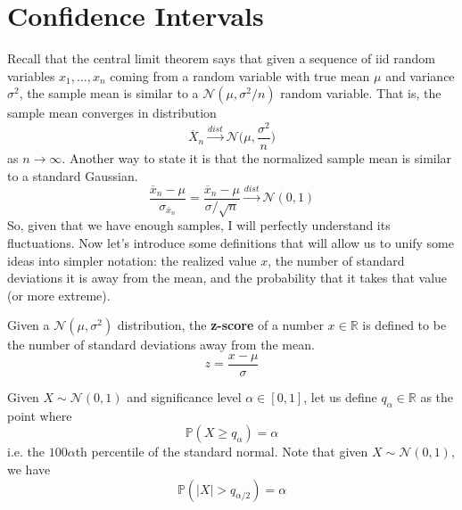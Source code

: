\section{Confidence Intervals}

  Recall that the central limit theorem says that given a sequence of iid random variables $x_1, \ldots, x_n$ coming from a random variable with true mean $\mu$ and variance $\sigma^2$, the sample mean is similar to a $\mathcal{N}(\mu, \sigma^2 / n)$ random variable. That is, the sample mean converges in distribution 
  \begin{equation}
    \overline{X}_n \xrightarrow{dist} \mathcal{N} \Big( \mu, \frac{\sigma^2}{n} \Big)
  \end{equation}
  as $n \rightarrow \infty$. Another way to state it is that the normalized sample mean is similar to a standard Gaussian. 
  \begin{equation}
    \frac{\overline{x}_n - \mu}{\sigma_{\overline{x}_n}} = \frac{\overline{x}_n - \mu}{\sigma / \sqrt{n}} \xrightarrow{dist} \mathcal{N}(0, 1)
  \end{equation}
  So, given that we have enough samples, I will perfectly understand its fluctuations. Now let's introduce some definitions that will allow us to unify some ideas into simpler notation: the realized value $x$, the number of standard deviations it is away from the mean, and the probability that it takes that value (or more extreme). 

  \begin{definition}[z-score]
    Given a $\mathcal{N}(\mu, \sigma^2)$ distribution, the \textbf{z-score} of a number $x \in \mathbb{R}$ is defined to be the number of standard deviations away from the mean. 
    \begin{equation}
      z = \frac{x - \mu}{\sigma}
    \end{equation}
  \end{definition}

  \begin{definition}[Percentile]
    Given $X \sim \mathcal{N}(0, 1)$ and significance level $\alpha \in [0, 1]$, let us define $q_{\alpha} \in \mathbb{R}$ as the point where 
    \begin{equation}
      \mathbb{P}(X \geq q_{\alpha}) = \alpha
    \end{equation}
    i.e. the $100\alpha$th percentile of the standard normal. Note that given $X \sim \mathcal{N}(0, 1)$, we have 
    \begin{equation}
      \mathbb{P} (|X| > q_{\alpha/2}) = \alpha
    \end{equation}
  \end{definition}

